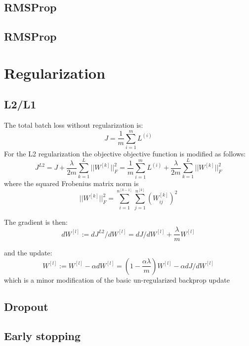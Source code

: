 \documentclass[10pt,a4paper]{article}
\begin{document}
\subsection{RMSProp}

\subsection{RMSProp}



\section{Regularization}

\subsection{L2/L1}
The total batch loss without regularization is:
\[  J = \frac{1}{m} \sum_{i=1}^{m} L^{(i)}     \]
For the L2 regularization the objective  objective function is modified as follows:
\[  J^{L2} =  J + \frac{\lambda}{2m} \sum_{k=1}^L ||W^{[k]}||_F^2 = \frac{1}{m} \sum_{i=1}^{m} L^{(i)} + \frac{\lambda}{2m} \sum_{k=1}^L ||W^{[k]}||_F^2     \]
where the squared Frobenius matrix norm is 
\[  ||W^{[k]}||_F^2 = \sum_{i=1}^{n^{[k-1]}} \sum_{j=1}^{n^{[k]}} (W^{[k]}_{ij})^2     \]

The gradient is then:
\[  dW^{[l]} := dJ^{L2}/ dW^{[l]} =  dJ/ dW^{[l]}  + \frac{\lambda}{m} W^{[l]}    \]

and the update:
\[  W^{[l]}:= W^{[l]} - \alpha  dW^{[l]}  = (1-\frac{\alpha \lambda}{m}  ) W^{[l]}  -   \alpha dJ/ dW^{[l]}      \]
which is a minor modification of the basic un-regularized  backprop update 

\subsection{Dropout}

\subsection{Early stopping} 









\end{document}
